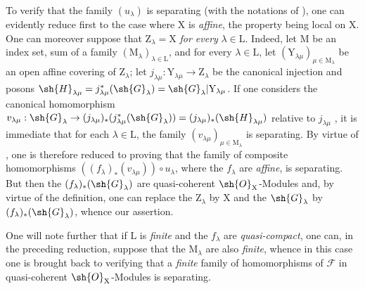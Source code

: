 \begin{env}[11.9.3]
\label{IV.11.9.3}
To verify that the family $(u_\lambda)$ is separating (with the notations of ), one can evidently reduce first to the case where $\mathrm{X}$ is \emph{affine}, the property being local on $\mathrm{X}$.
One can moreover suppose that $\mathrm{Z}_\lambda=\mathrm{X}$ \emph{for every} $\lambda\in\mathrm{L}$.
Indeed, let $\mathrm{M}$ be an index set, sum of a family $(\mathrm{M}_\lambda)_{\lambda\in\mathrm{L}}$, and for every $\lambda\in\mathrm{L}$, let $(\mathrm{Y}_{\lambda\mu})_{\mu\in\mathrm{M}_\lambda}$ be an open affine covering of $\mathrm{Z}_\lambda$; let $j_{\lambda\mu}:\mathrm{Y}_{\lambda\mu}\to\mathrm{Z}_\lambda$ be the canonical injection and posons $\sh{H}_{\lambda\mu}=j_{\lambda\mu}^*(\sh{G}_\lambda)=\sh{G}_\lambda|\mathrm{Y}_{\lambda\mu}$.
If one considers the canonical homomorphism $v_{\lambda\mu}:\sh{G}_\lambda\to(j_{\lambda\mu})_*(j_{\lambda\mu}^*(\sh{G}_\lambda))=(j_{\lambda\mu})_*(\sh{H}_{\lambda\mu})$ relative to $j_{\lambda\mu}$ , it is immediate that for each $\lambda\in\mathrm{L}$, the family $(v_{\lambda\mu})_{\mu\in\mathrm{M}_\lambda}$ is separating.
By virtue of , one is therefore reduced to proving that the family of composite homomorphisms $((f_\lambda)_*(v_{\lambda\mu}))\circ u_\lambda$, where the $f_\lambda$ are \emph{affine}, is separating.
But then the $(f_\lambda)_*(\sh{G}_\lambda)$ are quasi-coherent $\sh{O}_\mathrm{X}$-Modules  and, by virtue of the definition, one can replace the $\mathrm{Z}_\lambda$ by $\mathrm{X}$ and the $\sh{G}_\lambda$ by $(f_\lambda)_*(\sh{G}_\lambda)$, whence our assertion.

One will note further that if $\mathrm{L}$ is \emph{finite} and the $f_\lambda$ are \emph{quasi-compact}, one can, in the preceding reduction, suppose that the $\mathrm{M}_\lambda$ are also \emph{finite}, whence in this case one is brought back to verifying that a \emph{finite} family of homomorphisms of $\mathscr{F}$ in quasi-coherent $\sh{O}_\mathrm{X}$-Modules is separating.
\end{env}

